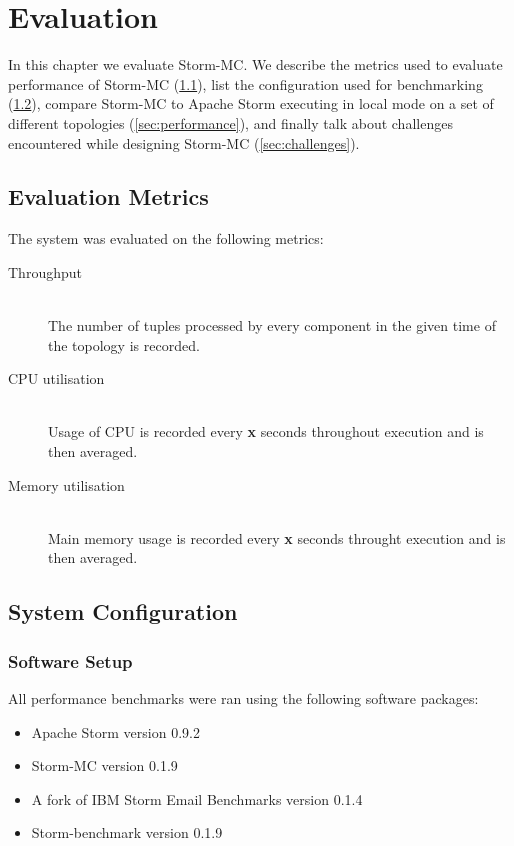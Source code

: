 \chapter{Evaluation}

In this chapter we evaluate Storm-MC. We describe the metrics used to evaluate performance of Storm-MC (\ref{sec:metrics}), list the configuration used for benchmarking (\ref{sec:system_conf}), compare Storm-MC to Apache Storm executing in local mode on a set of different topologies (\ref{sec:performance}), and finally talk about challenges encountered while designing Storm-MC (\ref{sec:challenges}).

\section{Evaluation Metrics}
\label{sec:metrics}

The system was evaluated on the following metrics:

\begin{description}
	\item[Throughput] \hfill \\
	The number of tuples processed by every component in the given time of the topology is recorded.
	\item[CPU utilisation] \hfill \\
	Usage of CPU is recorded every \textbf{x} seconds throughout execution and is then averaged.
	\item[Memory utilisation] \hfill \\
	Main memory usage is recorded every \textbf{x} seconds throught execution and is then averaged.
\end{description}

\section{System Configuration}
\label{sec:system_conf}

\subsection{Software Setup}


All performance benchmarks were ran using the following software packages:

\begin{itemize}
	\item Apache Storm version 0.9.2
	\item Storm-MC version 0.1.9
	\item A fork of IBM Storm Email Benchmarks version 0.1.4
	\item Storm-benchmark version 0.1.9
\end{itemize}

